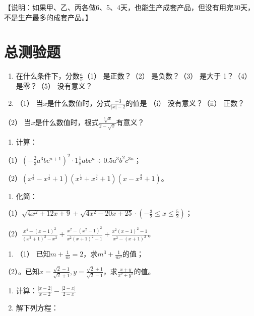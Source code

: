 【说明：如果甲、乙、丙各做6、5、4天，也能生产成套产品，但没有用完30天，不是生产最多的成套产品。】

\chapter{总测验题}

\begin{enumerate}
\item
  在什么条件下，分数\(\frac{a}{b}\)（1） 是正数？（2） 是负数？（3）
  是大于 1？（4） 是零？（5） 没有意义？
\item
  （1） 当\(x\)是什么数值时，分式\(\frac{-3}{|x| - 2}\)的值是 （i）
  没有意义？（ii） 正数？
\end{enumerate}

（2）
当\(x\)是什么数值时，根式\(\frac{\sqrt[5]{x}}{2 - \sqrt{x}}\)有意义？

\begin{enumerate}[start=3]
\item
  计算：
\end{enumerate}

（1）\(\left(-\frac{2}{3} a^{3}b c^{n+1}\right)^{2} \cdot 1 \frac{1}{8} a b c^{n} \div 0.5a^{3}b^{2}c^{3n}\)；

（2）\((x^{\frac{1}{2}} - x^{\frac{1}{2}} + 1)(x^{\frac{1}{2}} + x^{\frac{3}{2}} + 1)(x - x^{\frac{3}{2}} + 1)\)。

\begin{enumerate}[start=4]
\item
  化简：
\end{enumerate}

（1）\(\sqrt{4x^2 + 12x + 9} + \sqrt{4x^2 - 20x + 25} \cdot \left(-\frac{3}{2} \leqslant x \leqslant \frac{5}{2}\right)\)；

（2）\(\frac{x^4 - (x - 1)^2}{(x^2 + 1)^2 - x^2} + \frac{x^2 - (x^2 - 1)^2}{x^2(x + 1)^2 - 1} + \frac{x^2(x - 1)^2 - 1}{x^2 - (x + 1)^2}\)。

\begin{enumerate}[start=5]
\item
  （1） 已知\(m + \frac{1}{m} = 2\)，求\(m^3 + \frac{1}{m^3}\)的值；
\end{enumerate}

（2）。已知\(x = \frac{\sqrt{2} - 1}{\sqrt{2} + 1}, y = \frac{\sqrt{2} + 1}{\sqrt{2} - 1}\)，求\(\frac{x + y}{x^2 + y^2}\)的值。

\begin{enumerate}[start=6]
\item
  计算：\(\frac{|x-2|}{x-2}-\frac{|2-x|}{2-x}\)
\item
  解下列方程：
\end{enumerate}

